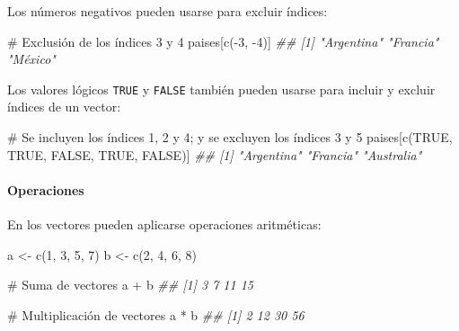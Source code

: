 \documentclass[
  letterpaper,
  DIV=11,
  numbers=noendperiod]{scrreprt}
\let\oldparagraph\paragraph
\renewcommand{\paragraph}[1]{\oldparagraph{#1}\mbox{}}
\newenvironment{Shaded}{\begin{snugshade}}{\end{snugshade}}
\newcommand{\CommentTok}[1]{\textcolor[rgb]{0.37,0.37,0.37}{#1}}
\newcommand{\ConstantTok}[1]{\textcolor[rgb]{0.56,0.35,0.01}{#1}}
\newcommand{\DecValTok}[1]{\textcolor[rgb]{0.68,0.00,0.00}{#1}}
\newcommand{\DocumentationTok}[1]{\textcolor[rgb]{0.37,0.37,0.37}{\textit{#1}}}
\newcommand{\FunctionTok}[1]{\textcolor[rgb]{0.28,0.35,0.67}{#1}}
\newcommand{\NormalTok}[1]{\textcolor[rgb]{0.00,0.23,0.31}{#1}}
\newcommand{\OtherTok}[1]{\textcolor[rgb]{0.00,0.23,0.31}{#1}}
\newcommand{\SpecialCharTok}[1]{\textcolor[rgb]{0.37,0.37,0.37}{#1}}
\begin{document}
Los números negativos pueden usarse para excluir índices:

\begin{Shaded}
\begin{Highlighting}[]
\CommentTok{\# Exclusión de los índices 3 y 4}
\NormalTok{paises[}\FunctionTok{c}\NormalTok{(}\SpecialCharTok{{-}}\DecValTok{3}\NormalTok{, }\SpecialCharTok{{-}}\DecValTok{4}\NormalTok{)]}
\DocumentationTok{\#\# [1] "Argentina" "Francia"   "México"}
\end{Highlighting}
\end{Shaded}

Los valores lógicos \texttt{TRUE} y \texttt{FALSE} también pueden usarse
para incluir y excluir índices de un vector:

\begin{Shaded}
\begin{Highlighting}[]
\CommentTok{\# Se incluyen los índices 1, 2 y 4; y se excluyen los índices 3 y 5}
\NormalTok{paises[}\FunctionTok{c}\NormalTok{(}\ConstantTok{TRUE}\NormalTok{, }\ConstantTok{TRUE}\NormalTok{, }\ConstantTok{FALSE}\NormalTok{, }\ConstantTok{TRUE}\NormalTok{, }\ConstantTok{FALSE}\NormalTok{)]}
\DocumentationTok{\#\# [1] "Argentina" "Francia"   "Australia"}
\end{Highlighting}
\end{Shaded}

\hypertarget{operaciones}{%
\paragraph{Operaciones}\label{operaciones}}

En los vectores pueden aplicarse operaciones aritméticas:

\begin{Shaded}
\begin{Highlighting}[]
\NormalTok{a }\OtherTok{\textless{}{-}} \FunctionTok{c}\NormalTok{(}\DecValTok{1}\NormalTok{, }\DecValTok{3}\NormalTok{, }\DecValTok{5}\NormalTok{, }\DecValTok{7}\NormalTok{)}
\NormalTok{b }\OtherTok{\textless{}{-}} \FunctionTok{c}\NormalTok{(}\DecValTok{2}\NormalTok{, }\DecValTok{4}\NormalTok{, }\DecValTok{6}\NormalTok{, }\DecValTok{8}\NormalTok{)}

\CommentTok{\# Suma de vectores}
\NormalTok{a }\SpecialCharTok{+}\NormalTok{ b}
\DocumentationTok{\#\# [1]  3  7 11 15}

\CommentTok{\# Multiplicación de vectores}
\NormalTok{a }\SpecialCharTok{*}\NormalTok{ b}
\DocumentationTok{\#\# [1]  2 12 30 56}
\end{Highlighting}
\end{Shaded}
\end{document}
